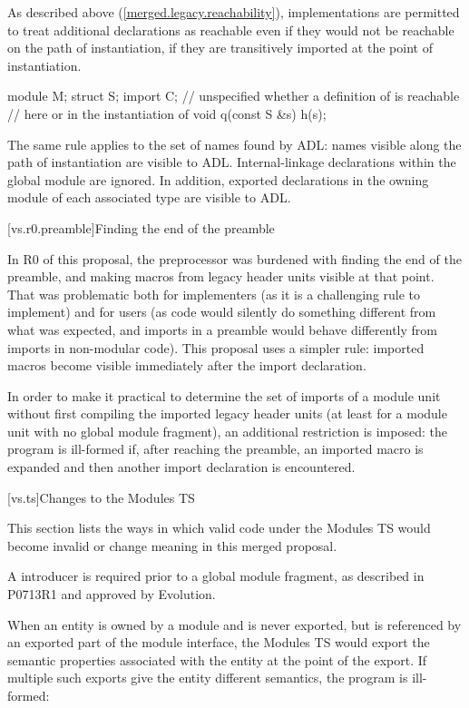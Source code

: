 \pnum
As described above (\ref{merged.legacy.reachability}),
implementations are permitted to treat additional declarations
as reachable even if they would not be reachable on the
path of instantiation,
if they are transitively imported at the
point of instantiation.
\begin{example}
\begin{codeblock}
module M;
struct S;
import C;
// unspecified whether a definition of  is reachable
// here or in the instantiation of 
void q(const S &s) { h(s); }
\end{codeblock}
\end{example}

\pnum
The same rule applies to the set of names found by ADL:
names visible along the path of instantiation are visible to ADL.
Internal-linkage declarations within the global module are ignored.
In addition, exported declarations in the owning module of
each associated type are visible to ADL.

[vs.r0.preamble]{Finding the end of the preamble}

\pnum
In R0 of this proposal, the preprocessor was burdened with finding
the end of the preamble, and making macros from legacy header units
visible at that point.
That was problematic both for implementers (as it is a challenging rule
to implement) and for users (as code would silently do something
different from what was expected, and imports in a preamble would
behave differently from imports in non-modular code).
This proposal uses a simpler rule:
imported macros become visible immediately after the import declaration.

\pnum
In order to make it practical to determine the set of imports of a
module unit without first compiling the imported legacy header units
(at least for a module unit with no global module fragment),
an additional restriction is imposed:
the program is ill-formed if, after reaching the preamble,
an imported macro is expanded
and then another import declaration is encountered.

[vs.ts]{Changes to the Modules TS}

\pnum
This section lists the ways in which valid code under the Modules TS
would become invalid or change meaning in this merged proposal.

\pnum
A  introducer is required prior to a global module fragment,
as described in P0713R1 and approved by Evolution.

\pnum
When an entity is owned by a module and is never exported,
but is referenced by an exported part of the module interface,
the Modules TS would export the semantic properties
associated with the entity at the point of the export.
If multiple such exports give the entity different semantics,
the program is ill-formed:

